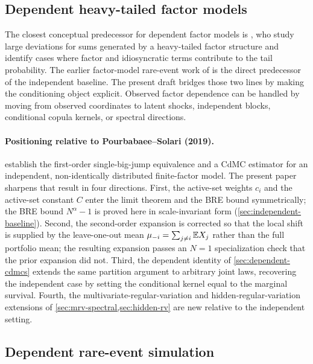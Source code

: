 \subsection{Dependent heavy-tailed factor models}

The closest conceptual predecessor for dependent factor models is
\citet{DjehicheSvensson2007}, who study large deviations for sums generated by a
heavy-tailed factor structure and identify cases where factor and idiosyncratic
terms contribute to the tail probability. The earlier factor-model rare-event
work of \citet{PourbabaeeSolari2019} is the direct predecessor of the
independent baseline. The present draft bridges those two lines by making the
conditioning object explicit. Observed factor dependence can be handled by
moving from observed coordinates to latent shocks, independent blocks,
conditional copula kernels, or spectral directions.

\paragraph{Positioning relative to Pourbabaee--Solari (2019).}
\citet{PourbabaeeSolari2019} establish the first-order single-big-jump
equivalence and a CdMC estimator for an independent, non-identically distributed
finite-factor model. The present paper sharpens that result in four directions.
First, the active-set weights $c_i$ and the active-set constant $C$ enter the
limit theorem and the BRE bound symmetrically; the BRE bound $N^\alpha-1$ is
proved here in scale-invariant form (\cref{sec:independent-baseline}). Second,
the second-order expansion is corrected so that the local shift is supplied by
the leave-one-out mean $\mu_{-i}=\sum_{j\ne i}\mathbb{E} X_j$ rather than the full
portfolio mean; the resulting expansion passes an $N=1$ specialization check
that the prior expansion did not. Third, the dependent identity of
\cref{sec:dependent-cdmcs} extends the same partition argument to arbitrary
joint laws, recovering the independent case by setting the conditional kernel
equal to the marginal survival. Fourth, the multivariate-regular-variation and
hidden-regular-variation extensions of \cref{sec:mrv-spectral,sec:hidden-rv}
are new relative to the independent setting.

\subsection{Dependent rare-event simulation}

